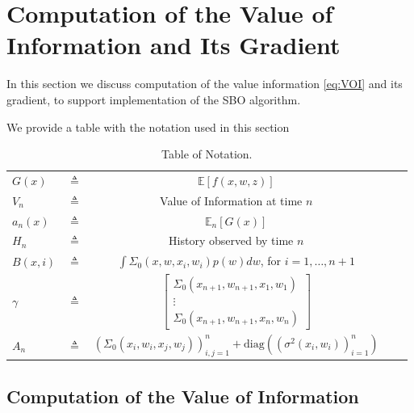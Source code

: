 \documentclass{article}
\newcommand{\w}{w}
\newcommand{\z}{z}
\begin{document}
\section{Computation of the Value of Information and Its Gradient}
\label{sec:VOI}

In this section we discuss computation of the value information \eqref{eq:VOI} and its gradient, to support implementation of the SBO algorithm.

We provide a table with the notation used in this section
\begin{table}[htbp]
\caption{Table of Notation.}
\label{table}
\centering
\vskip 0.2in
\begin{center}
\begin{small}
\begin{tabular}{lcccr}
\hline
$G(x)$ & $\triangleq$ & $\mathbb{E}[f(x,\w,\z)]$ \\
$V_{n}$ & $\triangleq$ & Value of Information at time $n$\\
$a_{n}\left(x\right)$ & $\triangleq$ & $\mathbb{E}_{n}\left[G(x) \right]$\\
$H_{n}$ & $\triangleq$ & History observed by time $n$\\
$B\left(x,i\right)$ & $\triangleq$ &  $\int\Sigma_{0}\left(x,\w,x_{i},\w_{i}\right)p(\w)d\w$, for $i=1,\ldots,n+1$\\
\belowspace
$\gamma$ & $\triangleq$ & $\left[\begin{array}{c}
\Sigma_{0}\left(x_{n+1},\w_{n+1},x_{1},\w_{1}\right)\\
\vdots\\
\Sigma_{0}\left(x_{n+1},\w_{n+1},x_{n},\w_{n}\right)
\end{array}\right]$\\
\belowspace
$A_{n}$ & $\triangleq$ & $\left(\Sigma_{0}\left(x_{i},w_{i},x_{j},w_{j}\right)\right)_{i,j=1}^{n} + \mbox{diag}\left(\left(\sigma^{2}\left(x_{i},w_{i}\right)\right)_{i=1}^{n}\right) $ \\
\hline
\end{tabular}
\end{small}
\end{center}
\vskip -0.1in
\end{table}

\subsection{Computation of the  Value of Information} 
\end{document}
